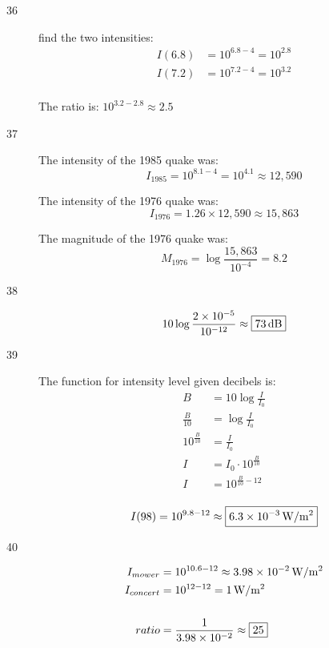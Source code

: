 \documentclass{exam}
\begin{document}
\begin{description}
      \item[36]
        find the two intensities:
        \begin{align*}
          I(6.8) &= 10^{6.8 - 4} = 10^{2.8} \\
          I(7.2) &= 10^{7.2 - 4} = 10^{3.2} \\
        \end{align*}

        The ratio is: $10^{3.2 - 2.8} \approx \boxed{2.5}$ 

      \pagebreak

      \item[37]
        The intensity of the 1985 quake was:
        \[
          I_{1985} = 10^{8.1 - 4} = 10^{4.1} \approx 12,590
        \]

        The intensity of the 1976 quake was: 
        \[
          I_{1976} = 1.26 \times 12,590 \approx 15,863
        \]

        The magnitude of the 1976 quake was:
        \[
          M_{1976} = \log \frac{15,863}{10^{-4}} = \boxed{8.2}
        \]

      \item[38]
        \[
          10 \log \frac{2 \times 10^{-5}}{10^{-12}} \approx \boxed{\unit[73]{dB}} 
        \]

      \item[39]
        The function for intensity level given decibels is:
        \begin{align*}
          B                 & = 10 \log \frac{I}{I_0} \\
          \frac{B}{10}      & = \log \frac{I}{I_0} \\
          10^{\frac{B}{10}} & = \frac{I}{I_0} \\
          I                 & = I_0 \cdot 10^{\frac{B}{10}} \\
          I                 & = 10^{\frac{B}{10} - 12} \\
        \end{align*}

        \[
          I(98) = 10^{9.8 - 12} \approx \boxed{ \unit[6.3 \times 10^{-3}]{W/m^2} }
        \]

      \item[40]
        \begin{align*}
          I_{mower}   & = 10^{10.6 - 12} \approx \unit[3.98 \times 10^{-2}]{W/m^2} \\
          I_{concert} & = 10^{12 - 12} = \unit[1]{W/m^2} \\
          \\
          ratio       & = \frac{1}{3.98 \times 10^{-2}} \approx \boxed{25} \\
        \end{align*}

    \end{description}
\end{document}
